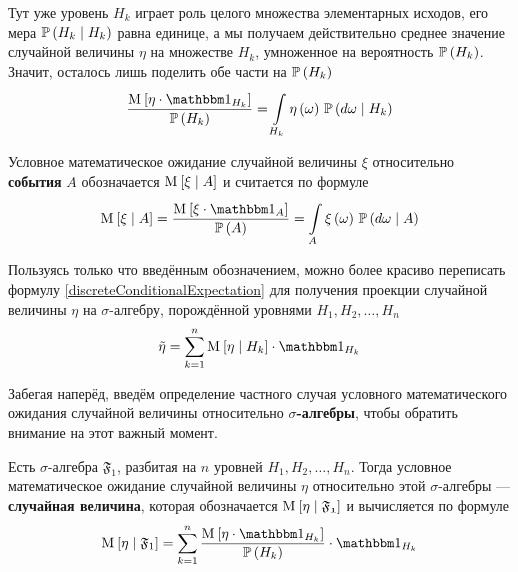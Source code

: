 Тут уже уровень $H_k$ играет роль целого множества элементарных исходов,
его мера $\mathbb{P}\left( H_k \;\middle|\; H_k \right)$ равна единице,
а мы получаем действительно среднее значение случайной величины $\eta$
на множестве $H_k$, умноженное на вероятность $\mathbb{P}\left( H_k \right)$.
Значит, осталось лишь поделить обе части на $\mathbb{P}\left( H_k \right)$
$$\frac{\Mean{ \eta \cdot \indicatorof{H_k} }}{\probability{H_k}}
        = \integrall{H_k}{\probability{d\omega \mcond H_k}}{
            \eta\left( \omega \right)}$$

\begin{definition}
    \label{eventConditionalExpectationDefinition}
    Условное математическое ожидание случайной величины $\xi$
    относительно \textbf{события} $A$ \cite[стр.~68]{BorovkovPT}
    обозначается $\operatorname{M}_{} \left[ \xi \;\middle|\; A \right]$ и считается по формуле
    $$\Mean{\xi \mcond A}
        = \frac{\Mean{\xi \cdot \indicatorof{A}}}{\probability{A}}
            = \integrall{A}{\probability{d\omega \mcond A}}{
                \xi\left( \omega \right)}$$
\end{definition}

Пользуясь только что введённым обозначением,
можно более красиво переписать формулу \eqref{discreteConditionalExpectation}
для получения проекции случайной величины $\eta$ на $\sigma$-алгебру,
порождённой уровнями $H_1, H_2, \dots, H_n$ 
$$\tilde{\eta}
    = \sum_{k=1}^n \Mean{ \eta \mcond H_k } \cdot \indicatorof{H_k}$$

Забегая наперёд,
введём определение частного случая условного математического ожидания
случайной величины относительно \textbf{$\sigma$-алгебры},
чтобы обратить внимание на этот важный момент.

\begin{definition}
    \label{discreteConditionalExpectationDefinition}
    Есть $\sigma$-алгебра $\mathfrak{F}_1$,
    разбитая на $n$ уровней $H_1, H_2, \dots, H_n$.
    Тогда условное математическое ожидание случайной величины
    $\eta$ относительно этой $\sigma$-алгебры --- \textbf{случайная величина},
    которая обозначается $\operatorname{M}_{} \left[  \eta \;\middle|\; \mathfrak{F_1}  \right]$
    и вычисляется по формуле
    $$\Mean{ \eta \mcond \mathfrak{F}_1 }
        = \sum_{k=1}^n
            \frac{\Mean{ \eta \cdot \indicatorof{H_k} }}
                {\probability{H_k}}
            \cdot \indicatorof{H_k}$$
\end{definition}

